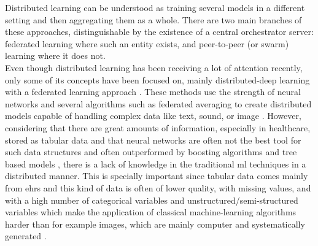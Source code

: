 Distributed learning \cite{distributed} can be understood as training several models in a different setting and then aggregating them as a whole. There are two main branches of these approaches, distinguishable by the existence of a central orchestrator server: federated learning where such an entity exists, and peer-to-peer (or swarm) \cite{swarm_learning} learning where it does not. \\
Even though distributed learning has been receiving a lot of attention recently, only some of its concepts have been focused on, mainly distributed-deep learning with a federated learning approach \cite{xuFederatedLearningHealthcare2021,leeFederatedLearningClinical2020}. These methods use the strength of neural networks and several algorithms such as federated averaging to create distributed models capable of handling complex data like text, sound, or image \cite{prayitnoSystematicReviewFederated2021}. However, considering that there are great amounts of information, especially in healthcare, stored as tabular data \cite{alvarezsanchezTAQIHToolTabular2019,dimartinoExplainableAIClinical2022,payrovnaziriExplainableArtificialIntelligence2020,mcelfreshWhenNeuralNets2023,klambauerSelfNormalizingNeuralNetworks2017} and that neural networks are often not the best tool for such data structures and often outperformed by boosting algorithms and tree based models \cite{borisovDeepNeuralNetworks2022a,grinsztajnWhyTreebasedModels2022a}, there is a lack of knowledge in the traditional \ac{ml} techniques in a distributed manner. This is specially important since tabular data comes mainly from \acp{ehr} and this kind of data is often of lower quality, with missing values, and with a high number of categorical variables and unstructured/semi-structured variables which make the application of classical machine-learning algorithms harder than for example images, which are mainly computer and systematically generated \cite{peekThreeControversiesHealth2018}.

